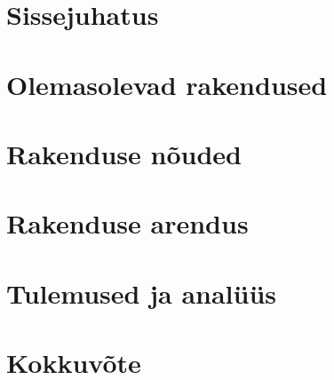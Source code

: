 \chapter{Sissejuhatus}\label{chapter:introduction}


\chapter{Olemasolevad rakendused}\label{chapter:taust}


\chapter{Rakenduse nõuded}\label{chapter:nõuded}


\chapter{Rakenduse arendus}\label{chapter:arendus}


\chapter{Tulemused ja analüüs}\label{chapter:tulemused ja analüüs}


\chapter{Kokkuvõte}\label{chapter:summary} 

